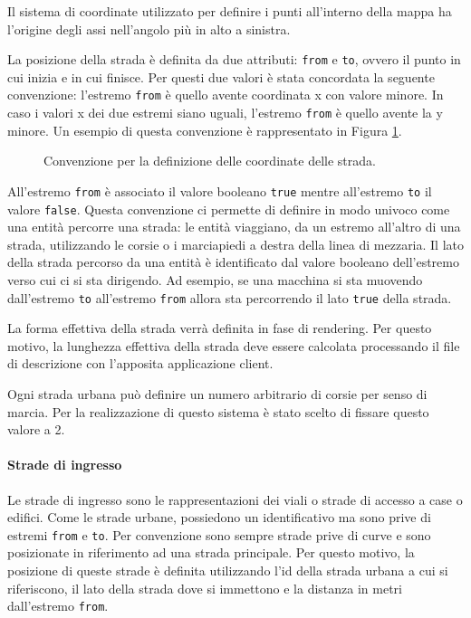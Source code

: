 Il sistema di coordinate utilizzato per definire i punti all'interno della mappa
ha l'origine degli assi nell'angolo più in alto a sinistra.

 La posizione della strada è definita da due attributi: \texttt{from} e
 \texttt{to}, ovvero il punto in cui inizia e in cui finisce.
Per questi due valori è stata concordata la seguente convenzione: l'estremo
\texttt{from} è quello avente coordinata x con valore minore. In caso i valori
x dei due estremi siano uguali, l'estremo \texttt{from} è quello avente la y
minore.
Un esempio di questa convenzione è rappresentato in Figura
\ref{fig:polaritastrade}.

\begin{figure}[H] %
\caption{Convenzione per la definizione delle coordinate delle strada.}
\label{fig:polaritastrade}
\end{figure}

All'estremo \texttt{from} è associato il valore booleano \texttt{true} mentre
all'estremo \texttt{to} il valore \texttt{false}.
Questa convenzione ci permette di definire in modo univoco come una entità
percorre una strada: le entità viaggiano, da un estremo all'altro di una strada,
utilizzando le corsie o i marciapiedi a destra della linea di mezzaria. Il lato
della strada percorso da una entità è identificato dal valore booleano
dell'estremo verso cui ci si sta dirigendo. Ad esempio, se una macchina si sta
muovendo dall'estremo \texttt{to} all'estremo \texttt{from} allora sta
percorrendo il lato \texttt{true} della strada.

La forma effettiva della strada verrà definita in fase di rendering. Per questo
motivo, la lunghezza effettiva della strada deve essere calcolata processando il
file di descrizione con l'apposita applicazione client.

Ogni strada urbana può definire un numero arbitrario di corsie per senso di
marcia.
Per la realizzazione di questo sistema è stato scelto di fissare questo valore a 2.

\paragraph*{Strade di ingresso}
Le strade di ingresso sono le rappresentazioni dei viali o strade di accesso a
case o edifici. Come le strade urbane, possiedono un identificativo ma sono
prive di estremi \texttt{from} e \texttt{to}.
Per convenzione sono sempre strade prive di curve e sono posizionate in
riferimento ad una strada principale. Per questo motivo, la posizione di queste
strade è definita utilizzando l'id della strada urbana a cui si riferiscono, il
lato della strada dove si immettono e la distanza in metri dall'estremo
\texttt{from}.

